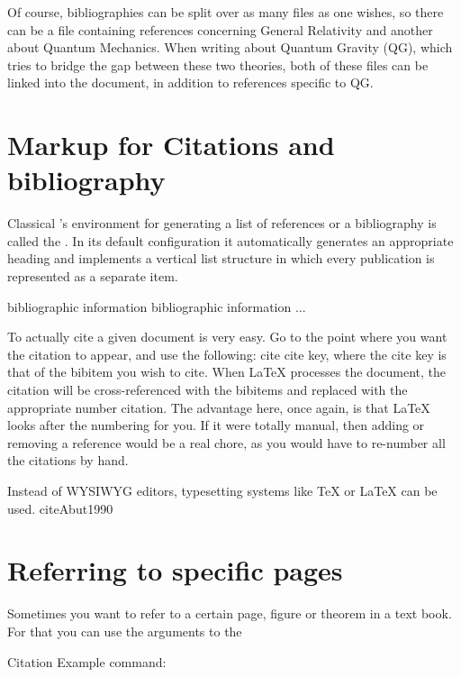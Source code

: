 \begin{refsection}
Of course, bibliographies can be split over as many files as one wishes, so there can be a file containing references concerning General Relativity and another about Quantum Mechanics. When writing about Quantum Gravity (QG), which tries to bridge the gap between these two theories, both of these files can be linked into the document, in addition to references specific to QG.

\section{Markup for Citations and bibliography}

Classical \latex's environment for generating a list of references or a bibliography is called
the . In its default configuration it automatically
generates an appropriate heading and implements a vertical list structure in which every publication is represented as a separate item.

\begin{teX}
\begin{thebibliography}{widest label}
 bibliographic information
 bibliographic information
      ...
\end{thebibliography}
\end{teX}

To actually cite a given document is very easy. Go to the point where you want the citation to appear, and use the following: cite cite key, where the cite key is that of the bibitem you wish to cite. When LaTeX processes the document, the citation will be cross-referenced with the bibitems and replaced with the appropriate number citation. The advantage here, once again, is that LaTeX looks after the numbering for you. If it were totally manual, then adding or removing a reference would be a real chore, as you would have to re-number all the citations by hand.

Instead of WYSIWYG editors, typesetting systems like TeX or LaTeX \citep{lamport2004} can be used. cite{Abut1990}

\section{Referring to specific pages}

Sometimes you want to refer to a certain page, figure or theorem in a text book. For that you can use the arguments to the 

\begin{texexample}{Citation Example}{}
 command:
\cite[p. 215]{Mittelbach2004}
\end{texexample}


\end{refsection}
